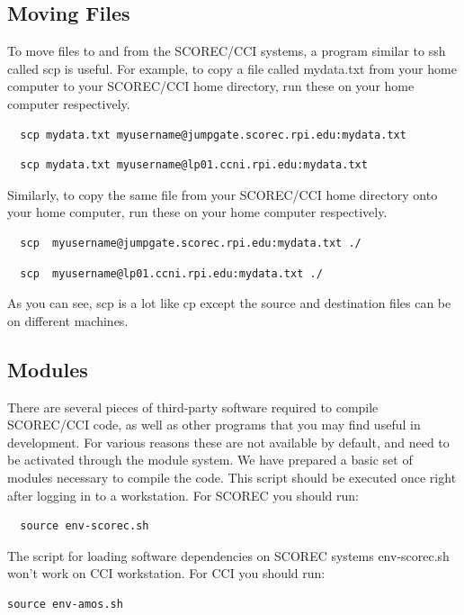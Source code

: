 \documentclass{article}
\begin{document}
\subsection{Moving Files}

To move files to and from the SCOREC/CCI systems, a program similar to ssh called scp is useful. For example, to copy a file called mydata.txt from your home computer to your SCOREC/CCI home directory, run these on your home computer respectively.
\begin{lstlisting}
  scp mydata.txt myusername@jumpgate.scorec.rpi.edu:mydata.txt
\end{lstlisting}
\begin{lstlisting}  
  scp mydata.txt myusername@lp01.ccni.rpi.edu:mydata.txt
\end{lstlisting}

Similarly, to copy the same file from your SCOREC/CCI home directory onto your home computer, run these on your home computer respectively.

\begin{lstlisting}
  scp  myusername@jumpgate.scorec.rpi.edu:mydata.txt ./
\end{lstlisting}
\begin{lstlisting}  
  scp  myusername@lp01.ccni.rpi.edu:mydata.txt ./
\end{lstlisting}  
As you can see, scp is a lot like cp except the source and destination files can be on different machines.

\subsection{Modules}

There are several pieces of third-party software required to compile SCOREC/CCI code, as well as other programs that you may find useful in development. For various reasons these are not available by default, and need to be activated through the module system. We have prepared a basic set of modules necessary to compile the code. This script should be executed once right after logging in to a workstation. For SCOREC you should run:
\begin{lstlisting}
  source env-scorec.sh
\end{lstlisting}
The script for loading software dependencies on SCOREC systems env-scorec.sh won't work on CCI workstation. For CCI you should run:
\begin{lstlisting}
source env-amos.sh
\end{lstlisting}
\end{document}
